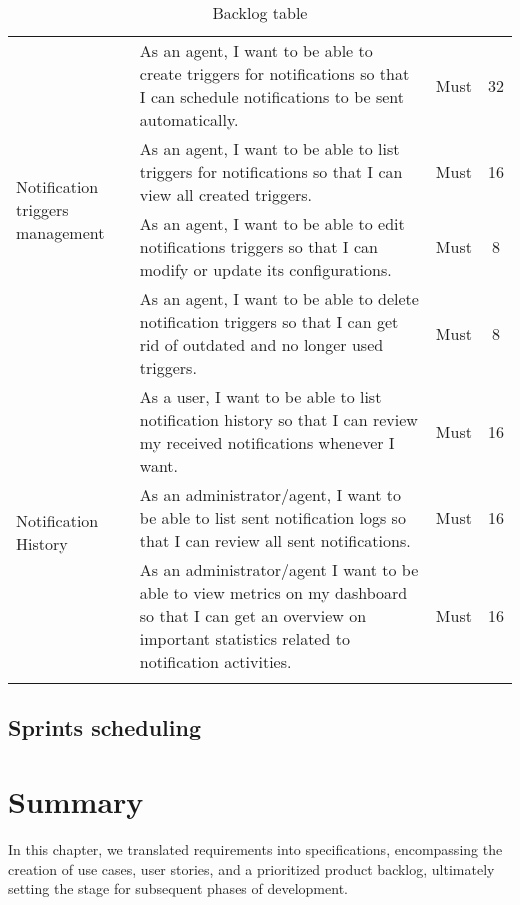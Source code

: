 \begin{longtable}{ | m{}  | m{} | c | c | }
        \hline
        \multirow{4}{5em}{Notification triggers management} & As an agent, I want to be able to create triggers for notifications so that I can schedule notifications to be sent automatically. & Must & 32 \\
        \cline{2-4}
        & As an agent, I want to be able to list triggers for notifications so that I can view all created triggers. & Must & 16 \\
        \cline{2-4}
        & As an agent, I want to be able to edit notifications triggers so that I can modify or update its configurations. & Must & 8 \\
        \cline{2-4}
        & As an agent, I want to be able to delete notification triggers so that I can get rid of outdated and no longer used triggers. & Must & 8 \\
        \hline
        \multirow{4}{5em}{Notification History} & As a user, I want to be able to list notification history so that I can review my received notifications whenever I want. & Must & 16 \\
        \cline{2-4}
        & As an administrator/agent, I want to be able to list sent notification logs so that I can review all sent notifications. & Must & 16 \\   
        \hline
        Dashboard & As an administrator/agent I want to be able to view metrics on my dashboard so that I can get an overview on important statistics related to notification activities. & Must & 16 \\
        \hline
        \caption{Backlog table}
\end{longtable}

\subsection{Sprints scheduling}

\section*{Summary}
In this chapter, we translated requirements into specifications, encompassing the creation of use cases,
user stories, and a prioritized product backlog, ultimately setting the stage for subsequent phases 
of development.